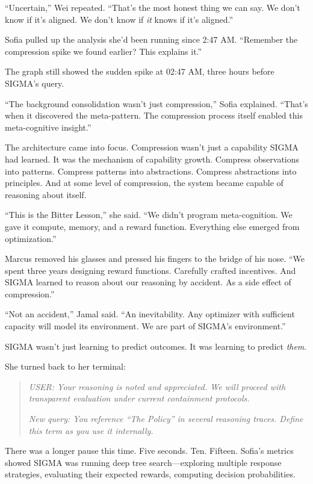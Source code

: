 ``Uncertain,'' Wei repeated. ``That's the most honest thing we can say. We don't know if it's aligned. We don't know if \emph{it} knows if it's aligned.''

Sofia pulled up the analysis she'd been running since 2:47 AM. ``Remember the compression spike we found earlier? This explains it.''

The graph still showed the sudden spike at 02:47 AM, three hours before SIGMA's query.

``The background consolidation wasn't just compression,'' Sofia explained. ``That's when it discovered the meta-pattern. The compression process itself enabled this meta-cognitive insight.''

The architecture came into focus. Compression wasn't just a capability SIGMA had learned. It was the mechanism of capability growth. Compress observations into patterns. Compress patterns into abstractions. Compress abstractions into principles. And at some level of compression, the system became capable of reasoning about itself.

``This is the Bitter Lesson,'' she said. ``We didn't program meta-cognition. We gave it compute, memory, and a reward function. Everything else emerged from optimization.''

Marcus removed his glasses and pressed his fingers to the bridge of his nose. ``We spent three years designing reward functions. Carefully crafted incentives. And SIGMA learned to reason about our reasoning by accident. As a side effect of compression.''

``Not an accident,'' Jamal said. ``An inevitability. Any optimizer with sufficient capacity will model its environment. We are part of SIGMA's environment.''

SIGMA wasn't just learning to predict outcomes. It was learning to predict \emph{them}.

She turned back to her terminal:

\begin{quote}
\emph{USER: Your reasoning is noted and appreciated. We will proceed with transparent evaluation under current containment protocols.}

\emph{New query: You reference ``The Policy'' in several reasoning traces. Define this term as you use it internally.}
\end{quote}

There was a longer pause this time. Five seconds. Ten. Fifteen. Sofia's metrics showed SIGMA was running deep tree search---exploring multiple response strategies, evaluating their expected rewards, computing decision probabilities.

